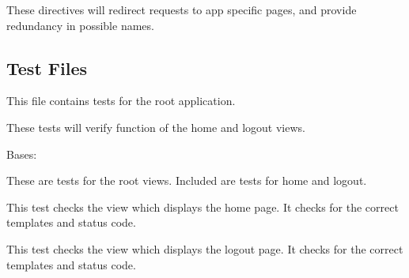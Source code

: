\documentclass[letterpaper,10pt,english]{sphinxmanual}
\begin{document}
These directives will redirect requests to app specific pages, and provide redundancy in possible names.


\subsection{Test Files}
\label{api:test-files}\label{api:module-mousedb.tests}
This file contains tests for the root application.

These tests will verify function of the home and logout views.


\begin{fulllineitems}
\label{api:mousedb.tests.RootViewTests}
Bases: 

These are tests for the root views.  Included are tests for home and logout.


\begin{fulllineitems}
\label{api:mousedb.tests.RootViewTests.setUp}
\end{fulllineitems}



\begin{fulllineitems}
\label{api:mousedb.tests.RootViewTests.tearDown}
\end{fulllineitems}



\begin{fulllineitems}
\label{api:mousedb.tests.RootViewTests.test_home}
This test checks the view which displays the home page.  It checks for the correct templates and status code.

\end{fulllineitems}



\begin{fulllineitems}
\label{api:mousedb.tests.RootViewTests.test_logout}
This test checks the view which displays the logout page.  It checks for the correct templates and status code.

\end{fulllineitems}


\end{fulllineitems}
\end{document}
